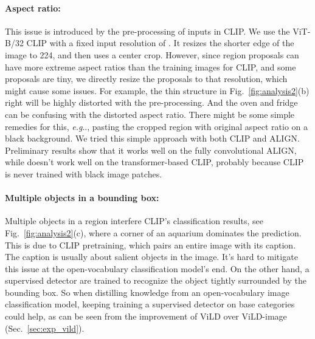 \documentclass{article} \usepackage{iclr2022_conference,times}
\makeatletter
\DeclareRobustCommand\onedot{\futurelet\@let@token\@onedot}
\def\@onedot{\ifx\@let@token.\else.\null\fi\xspace}
\def\eg{\emph{e.g}\onedot} \def\Eg{\emph{E.g}\onedot}
\makeatother
\begin{document}
\paragraph{Aspect ratio:}
This issue is introduced by the pre-processing of inputs in CLIP. We use the ViT-B/32 CLIP with a fixed input resolution of . It resizes the shorter edge of the image to 224, and then uses a center crop. However, since region proposals can have more extreme aspect ratios than the training images for CLIP, and some proposals are tiny, we directly resize the proposals to that resolution, which might cause some issues. For example, the thin structure in Fig.~\ref{fig:analysis2}(b) right will be highly distorted with the pre-processing. And the oven and fridge can be confusing with the distorted aspect ratio. There might be some simple remedies for this, \eg, pasting the cropped region with original aspect ratio on a black background. We tried this simple approach with both CLIP and ALIGN. Preliminary results show that it works well on the fully convolutional ALIGN, while doesn't work well on the transformer-based CLIP, probably because CLIP is never trained with black image patches.

\paragraph{Multiple objects in a bounding box:}
Multiple objects in a region interfere CLIP's classification results, see Fig.~\ref{fig:analysis2}(c), where a corner of an aquarium dominates the prediction.  This is due to CLIP pretraining, which pairs an entire image with its caption. The caption is usually about salient objects in the image.
It's hard to mitigate this issue at the open-vocabulary classification model's end.
On the other hand, a supervised detector are trained to recognize the object tightly surrounded by the bounding box. So when distilling knowledge from an open-vocabulary image classification model, keeping training a supervised detector on base categories could help, as can be seen from the improvement of ViLD over ViLD-image (Sec.~\ref{sec:exp_vild}). 
\end{document}

